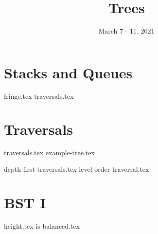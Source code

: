 \documentclass[11pt]{exam}
\title{Trees}
\date{March 7 - 11, 2021}
\begin{document}
\maketitle


\section{Stacks and Queues}
\begin{questions}
{fringe.tex}
{traversals.tex}
\end{questions}
\clearpage

\section{Traversals}
{traversals.tex}
{example-tree.tex}
\begin{questions}
{depth-first-traversals.tex}
{level-order-traversal.tex}
\enlargethispage{2in}
\end{questions}
\clearpage

\section{BST I}
\begin{questions}
{height.tex}
{is-balanced.tex}
\end{questions}
\clearpage
\end{document}
